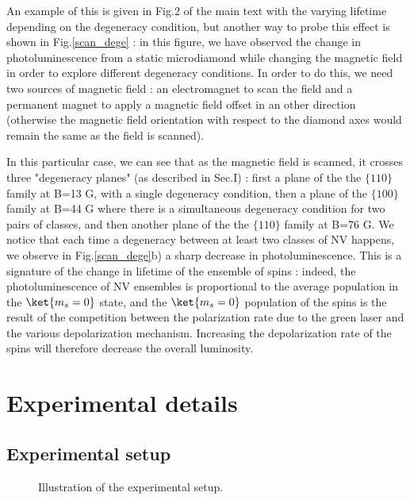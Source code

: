 \documentclass[preprintnumbers,amsmath,amssymb,onecolumn,12pt]{revtex4}
\begin{document}
An example of this is given in Fig.2 of the main text with the varying lifetime depending on the degeneracy condition, but another way to probe this effect is shown in Fig.\ref{scan_dege} : in this figure, we have observed the change in photoluminescence from a static microdiamond while changing the magnetic field in order to explore different degeneracy conditions. In order to do this, we need two sources of magnetic field : an electromagnet to scan the field and a permanent magnet to apply a magnetic field offset in an other direction (otherwise the magnetic field orientation with respect to the diamond axes would remain the same as the field is scanned).

In this particular case, we can see that as the magnetic field is scanned, it crosses three "degeneracy planes" (as described in Sec.I) : first a plane of the the $\{ 110 \}$ family at B=13 G, with a single degeneracy condition, then a plane of the $\{ 100 \}$ family at B=44 G where there is a simultaneous degeneracy condition for two pairs of classes, and then another plane of the the $\{ 110 \}$ family at B=76 G. We notice that each time a degeneracy between at least two classes of NV happens, we observe in Fig.\ref{scan_dege}b) a sharp decrease in photoluminescence. This is a signature of the change in lifetime of the ensemble of spins : indeed, the photoluminescence of NV ensembles is proportional to the average population in the $\ket{m_s=0}$ state, and the $\ket{m_s=0}$ population of the spins is the result of the competition between the polarization rate due to the green laser and the various depolarization mechanism. Increasing the depolarization rate of the spins will therefore decrease the overall luminosity.



\section{Experimental details}

\subsection{Experimental setup}

\begin{figure}[!ht]
  \centering {}
  \caption{Illustration of the experimental setup.}
	\label{Optics}
\end{figure}
\end{document}
